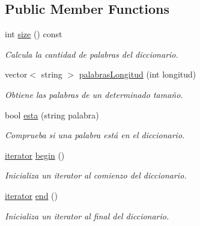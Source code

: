 \subsection*{Public Member Functions}
\begin{DoxyCompactItemize}
\item 
int \mbox{\hyperlink{classDiccionario_a74ea14ecba52288b84ffc6ea1f2fba99}{size}} () const
\begin{DoxyCompactList}\small\item\em Calcula la cantidad de palabras del diccionario. \end{DoxyCompactList}\item 
vector$<$ string $>$ \mbox{\hyperlink{classDiccionario_a11bd184b32340347d6757925fafdfc14}{palabras\+Longitud}} (int longitud)
\begin{DoxyCompactList}\small\item\em Obtiene las palabras de un determinado tamaño. \end{DoxyCompactList}\item 
bool \mbox{\hyperlink{classDiccionario_a15c42990a5b7d00bc9522ab5e4847bcb}{esta}} (string palabra)
\begin{DoxyCompactList}\small\item\em Comprueba si una palabra está en el diccionario. \end{DoxyCompactList}\item 
\mbox{\label{classDiccionario_a3f42d480e74efbd66b8837d0ea1e491d}} 
\mbox{\hyperlink{classDiccionario_1_1iterator}{iterator}} \mbox{\hyperlink{classDiccionario_a3f42d480e74efbd66b8837d0ea1e491d}{begin}} ()
\begin{DoxyCompactList}\small\item\em Inicializa un iterator al comienzo del diccionario. \end{DoxyCompactList}\item 
\mbox{\label{classDiccionario_abe91cc666c92f7f003507a82bdcd8c35}} 
\mbox{\hyperlink{classDiccionario_1_1iterator}{iterator}} \mbox{\hyperlink{classDiccionario_abe91cc666c92f7f003507a82bdcd8c35}{end}} ()
\begin{DoxyCompactList}\small\item\em Inicializa un iterator al final del diccionario. \end{DoxyCompactList}\end{DoxyCompactItemize}
